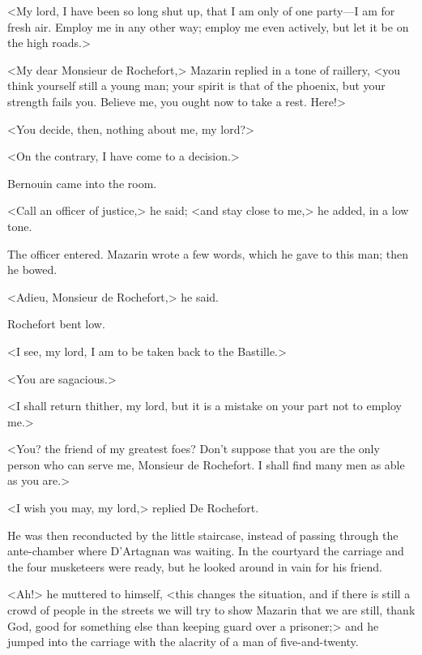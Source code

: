 <My lord, I have been so long shut up, that I am only of one party—I am for fresh air. Employ me in any other way; employ me even actively, but let it be on the high roads.>

<My dear Monsieur de Rochefort,> Mazarin replied in a tone of raillery, <you think yourself still a young man; your spirit is that of the phoenix, but your strength fails you. Believe me, you ought now to take a rest. Here!>

<You decide, then, nothing about me, my lord?>

<On the contrary, I have come to a decision.>

Bernouin came into the room.

<Call an officer of justice,> he said; <and stay close to me,> he added, in a low tone.

The officer entered. Mazarin wrote a few words, which he gave to this man; then he bowed.

<Adieu, Monsieur de Rochefort,> he said.

Rochefort bent low.

<I see, my lord, I am to be taken back to the Bastille.>

<You are sagacious.>

<I shall return thither, my lord, but it is a mistake on your part not to employ me.>

<You? the friend of my greatest foes? Don't suppose that you are the only person who can serve me, Monsieur de Rochefort. I shall find many men as able as you are.>

<I wish you may, my lord,> replied De Rochefort.

He was then reconducted by the little staircase, instead of passing through the ante-chamber where D'Artagnan was waiting. In the courtyard the carriage and the four musketeers were ready, but he looked around in vain for his friend.

<Ah!> he muttered to himself, <this changes the situation, and if there is still a crowd of people in the streets we will try to show Mazarin that we are still, thank God, good for something else than keeping guard over a prisoner;> and he jumped into the carriage with the alacrity of a man of five-and-twenty. 